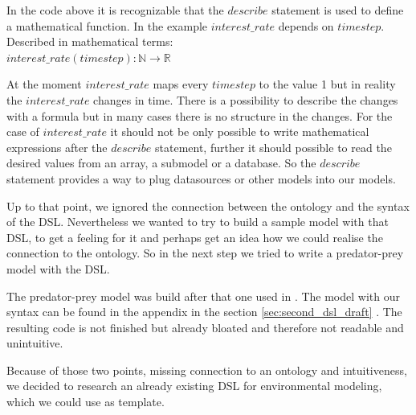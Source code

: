 \par
In the code above it is recognizable that the $describe$ statement is used to define a mathematical function. In the example $interest\_rate$ depends on $timestep$. Described in mathematical terms:\\
$interest\_rate(timestep) : \mathbb{N} \rightarrow  \mathbb{R}$
\par
At the moment $interest\_rate$ maps every $timestep$ to the value 1 but in reality the $interest\_rate$ changes in time. There is a possibility to describe the changes with a formula but in many cases there is no structure in the changes. For the case of $interest\_rate$ it should not be only possible to write mathematical expressions after the $describe$ statement, further it should possible to read the desired values from an array, a submodel or a database. So the $describe$ statement provides a way to plug datasources or other models into our models.
\par
Up to that point, we ignored the connection between the ontology and the syntax of the DSL. Nevertheless we wanted to try to build a sample model with that DSL, to get a feeling for it and perhaps get an idea how we could realise the connection to the ontology. So in the next step we tried to write a predator-prey model with the DSL.
\par
The predator-prey model was build after that one used in \autocite{dsl:dynamo}. The model with our syntax can be found in the appendix in the section \ref{sec:second_dsl_draft} .
The resulting code is not finished but already bloated and therefore not readable and unintuitive.
\par
Because of those two points, missing connection to an ontology and intuitiveness, we decided to research an already existing DSL for environmental modeling, which we could use as template.

